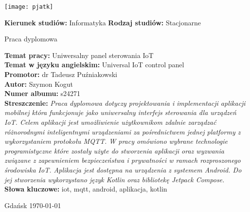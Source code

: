 \thispagestyle{empty}

\vspace*{2em}

\begin{center}
    \texttt{[image: pjatk]}
\end{center}

\vspace{2em}

\textbf{Kierunek studiów:} Informatyka
\hfill
\textbf{Rodzaj studiów:} Stacjonarne

\vspace{2em}

\begin{center}
    \Huge
    Praca dyplomowa
\end{center}

\vspace{3em}

\textbf{Temat pracy:} Uniwersalny panel sterowania IoT\\
\textbf{Temat w języku angielskim:} Universal IoT control panel\\
\textbf{Promotor:} dr Tadeusz Puźniakowski\\

\textbf{Autor:} Szymon Kogut\\
\textbf{Numer albumu:} s24271\\

\textbf{Streszczenie:}
\textsl{Praca dyplomowa dotyczy projektowania i implementacji aplikacji mobilnej która funkcjonuje jako uniwersalny interfejs sterowania dla urządzeń IoT. Celem aplikacji jest umożliwienie użytkownikom zdalnie zarządzać różnorodnymi inteligentnymi urządzeniami za pośrednictwem jednej platformy z wykorzystaniem protokołu MQTT. W pracy omówiono wybrane technologie programistyczne które zostały użyte do stworzenia aplikacji oraz wyzwania związane z zapewnieniem bezpieczeństwa i prywatności w ramach rozproszonego środowiska IoT. Aplikacja jest dostępna na urządzenia z systemem Android. Do jej stworzenia wykorzystano język Kotlin oraz bibliotekę Jetpack Compose.}\\

\textbf{Słowa kluczowe:} iot, mqtt, android, aplikacja, kotlin

\vfill

\begin{center}
    Gdańsk \today
\end{center}